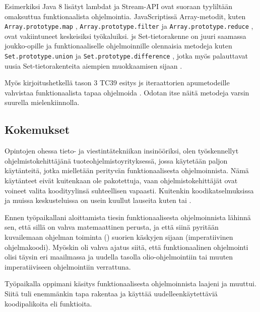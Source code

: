 Esimerkiksi Java 8 lisätyt lambdat \cite{oracle_function_package} ja Stream-API \cite{oracle_stream_api} ovat suoraan tyyliltään omaksuttua funktionaalista ohjelmointia. JavaScriptissä Array-metodit, kuten \texttt{Array.prototype.map} \cite{mdn_array_map}, \texttt{Array.prototype.filter} \cite{mdn_array_filter} ja \texttt{Array.prototype.reduce} \cite{mdn_array_reduce}, ovat vakiintuneet keskeisiksi työkaluiksi. \gls{js} Set-tietorakenne on juuri saamassa joukko-opille ja funktionaaliselle ohjelmoinnille olennaisia metodeja kuten \texttt{Set.prototype.union} \cite{mdn_set_union} ja \texttt{Set.prototype.difference} \cite{mdn_set_intersection}, jotka myös palauttavat uusia Set-tietorakenteita aiempien muokkaamisen sijaan \cite{mdn_set_methods}.

Myös kirjoitushetkellä tason 3 TC39 esitys \gls{js} iteraattorien apumetodeille vahvistaa funktionaalista tapaa ohjelmoida \cite{tc39_iterator_helpers}. Odotan itse näitä metodeja varsin suurella mielenkiinnolla.

\subsection{Kokemukset}


Opintojen ohessa tieto- ja viestintätekniikan insinööriksi, olen työskennellyt ohjelmistokehittäjänä tuoteohjelmistoyrityksessä, jossa käytetään paljon käytänteitä, jotka mielletään perityvän funktionaalisesta ohjelmoinnista. Nämä käytänteet eivät kuitenkaan ole pakotettuja, vaan ohjelmistokehittäjät ovat voineet valita koodityylinsä suhteellisen vapaasti. Kuitenkin koodikatselmuksissa ja muissa keskusteluissa on usein kuullut lauseita kuten  tai .

Ennen työpaikallani aloittamista tiesin funktionaalisesta ohjelmoinnista lähinnä sen, että sillä on vahva matemaattinen perusta, ja että siinä pyritään kuvailemaan ohjelman toiminta () suorien käskyjen sijaan (imperatiivinen ohjelmakoodi). Myöskin oli vahva ajatus siitä, että funktionaalinen ohjelmointi olisi täysin eri maailmassa ja uudella tasolla olio-ohjelmointiin tai muuten imperatiiviseen ohjelmointiin verrattuna.

Työpaikalla oppimani käsitys funktionaalisesta ohjelmoinnista laajeni ja muuttui. Siitä tuli enemmänkin tapa rakentaa ja käyttää uudelleenkäytettäviä koodipalikoita eli funktioita.

